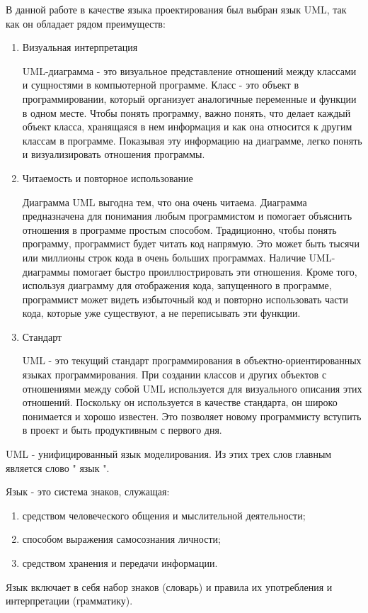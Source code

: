 В данной работе в качестве языка проектирования был выбран язык UML, так как он обладает рядом преимуществ:
\begin{enumerate}

\item Визуальная интерпретация

UML-диаграмма - это визуальное представление отношений между классами и сущностями в компьютерной программе. Класс - это объект в программировании, который организует аналогичные переменные и функции в одном месте. Чтобы понять программу, важно понять, что делает каждый объект класса, хранящаяся в нем информация и как она относится к другим классам в программе. Показывая эту информацию на диаграмме, легко понять и визуализировать отношения программы.

\item Читаемость и повторное использование

Диаграмма UML выгодна тем, что она очень читаема. Диаграмма предназначена для понимания любым программистом и помогает объяснить отношения в программе простым способом. Традиционно, чтобы понять программу, программист будет читать код напрямую. Это может быть тысячи или миллионы строк кода в очень больших программах. Наличие UML-диаграммы помогает быстро проиллюстрировать эти отношения. Кроме того, используя диаграмму для отображения кода, запущенного в программе, программист может видеть избыточный код и повторно использовать части кода, которые уже существуют, а не переписывать эти функции.

\item Стандарт

UML - это текущий стандарт программирования в объектно-ориентированных языках программирования. При создании классов и других объектов с отношениями между собой UML используется для визуального описания этих отношений. Поскольку он используется в качестве стандарта, он широко понимается и хорошо известен. Это позволяет новому программисту вступить в проект и быть продуктивным с первого дня.

\end{enumerate}
\cite{nou}
UML - унифицированный язык моделирования. Из этих трех слов главным является слово " язык ".

    Язык - это система знаков, служащая:
\begin{enumerate}


        \item средством человеческого общения и мыслительной деятельности;
        \item способом выражения самосознания личности;
        \item средством хранения и передачи информации.
\end{enumerate}
\cite{craig_uml}
    Язык включает в себя набор знаков (словарь) и правила их употребления и интерпретации (грамматику).

